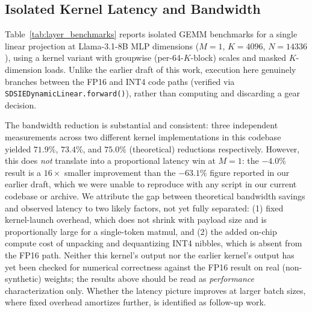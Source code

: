 \documentclass[10pt,journal,compsoc,twocolumn]{IEEEtran}
\begin{document}
\subsection{Isolated Kernel Latency and Bandwidth}
\label{sec:kernel_results}
Table~\ref{tab:layer_benchmarks} reports isolated GEMM benchmarks for a single linear projection at Llama-3.1-8B MLP dimensions ($M{=}1$, $K{=}4096$, $N{=}14336$), using a kernel variant with groupwise (per-64-$K$-block) scales and masked $K$-dimension loads. Unlike the earlier draft of this work, execution here genuinely branches between the FP16 and INT4 code paths (verified via \texttt{SDSIEDynamicLinear.forward()}), rather than computing and discarding a gear decision.
\begin{table}[t]
\caption{Isolated Linear-Projection Latency and Bandwidth, RTX 5090 Blackwell ($M{=}1$, $K{=}4096$, $N{=}14336$, synthetic weights).}
\label{tab:layer_benchmarks}
\centering
{}
\end{table}

The bandwidth reduction is substantial and consistent: three independent measurements across two different kernel implementations in this codebase yielded $71.9\%$, $73.4\%$, and $75.0\%$ (theoretical) reductions respectively. However, this does \textit{not} translate into a proportional latency win at $M{=}1$: the $-4.0\%$ result is a $16\times$ smaller improvement than the $-63.1\%$ figure reported in our earlier draft, which we were unable to reproduce with any script in our current codebase or archive. We attribute the gap between theoretical bandwidth savings and observed latency to two likely factors, not yet fully separated: (1) fixed kernel-launch overhead, which does not shrink with payload size and is proportionally large for a single-token matmul, and (2) the added on-chip compute cost of unpacking and dequantizing INT4 nibbles, which is absent from the FP16 path. Neither this kernel's output nor the earlier kernel's output has yet been checked for numerical correctness against the FP16 result on real (non-synthetic) weights; the results above should be read as \textit{performance} characterization only. Whether the latency picture improves at larger batch sizes, where fixed overhead amortizes further, is identified as follow-up work.
\end{document}
